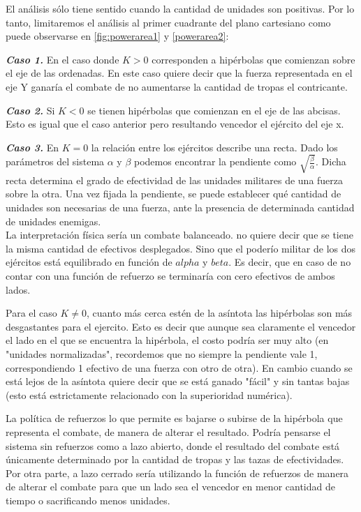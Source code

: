 \documentclass{sig-alternate}
\begin{document}
El an\'alisis s\'olo tiene sentido cuando la cantidad de unidades son positivas. Por lo tanto, limitaremos el an\'alisis al primer cuadrante del plano cartesiano como puede observarse en \ref{fig:powerarea1} y \ref{powerarea2}:


\textbf{\textit{Caso 1.}} En el caso donde $K > 0$ corresponden a hip\'erbolas que comienzan
sobre el eje de las ordenadas. En este caso quiere decir que la fuerza representada
en el eje Y ganar\'ia el combate de no aumentarse la cantidad de tropas
el contricante.


\textbf{\textit{Caso 2.}} Si $K<0$ se tienen hip\'erbolas que comienzan
en el eje de las abcisas. Esto es igual que el caso anterior pero resultando vencedor el ejército del eje x.

\textbf{\textit{Caso 3.}} 
En $K=0$ la relación entre los ejércitos describe una recta. Dado los parámetros del sistema $\alpha$ y $\beta$ podemos encontrar la pendiente como $\sqrt{\frac{\beta}{\alpha}}$. Dicha recta determina el grado de efectividad de las unidades militares de una fuerza sobre la otra. Una vez fijada la pendiente, se puede 
establecer qué cantidad de unidades son necesarias de una fuerza, ante la presencia de determinada cantidad de unidades enemigas.  \\
La interpretación f\'isica ser\'ia un combate balanceado. no quiere decir que se tiene la misma cantidad de efectivos desplegados. Sino que el poderío militar de los dos ej\'ercitos está equilibrado en función de $alpha$ y $beta$. Es decir, que en caso de no contar con una funci\'on de refuerzo se terminar\'ia con cero efectivos de ambos lados.

Para el caso $K \ne 0$, cuanto m\'as cerca est\'en de la as\'intota las hip\'erbolas son m\'as
desgastantes para el ejercito. Esto es decir que aunque sea claramente
el vencedor el lado en el que se encuentra la hip\'erbola, el costo
podr\'ia ser muy alto (en "unidades normalizadas", recordemos que no
siempre la pendiente vale 1, correspondiendo 1 efectivo de una fuerza
con otro de otra). En cambio cuando se está lejos de la as\'intota
quiere decir que se está ganado "f\'acil" y sin tantas bajas (esto est\'a
estrictamente relacionado con la superioridad num\'erica).

La política de refuerzos lo que permite es bajarse o subirse de la
hip\'erbola que representa el combate, de manera de alterar el
resultado. Podr\'ia pensarse el sistema sin refuerzos como a lazo
abierto, donde el resultado del combate está \'unicamente determinado
por la cantidad de tropas y las tazas de efectividades. Por otra
parte, a lazo cerrado ser\'ia utilizando la funci\'on de refuerzos de
manera de alterar el combate para que un lado sea el vencedor en menor
cantidad de tiempo o sacrificando menos unidades.
\end{document}
